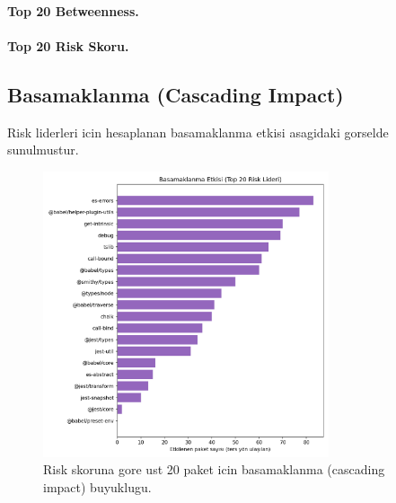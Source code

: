 \documentclass[11pt,a4paper]{article}
\begin{document}
\paragraph{Top 20 Betweenness.}

\paragraph{Top 20 Risk Skoru.}

\subsection{Basamaklanma (Cascading Impact)}
Risk liderleri icin hesaplanan basamaklanma etkisi asagidaki gorselde sunulmustur.
\begin{figure}[h]
  \centering
  \includegraphics[width=0.75\textwidth]{cascade_impact_top20.png}
  \caption{Risk skoruna gore ust 20 paket icin basamaklanma (cascading impact) buyuklugu.}
\end{figure}
\end{document}
